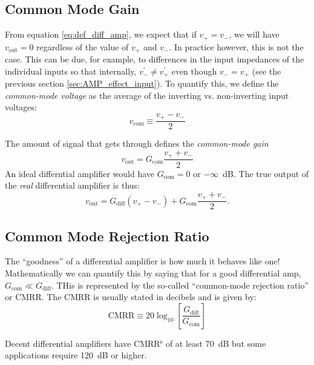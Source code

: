 \documentclass{tufte-book}
\begin{document}
\subsection{Common Mode Gain}
From equation \ref{eq:def_diff_amp}, we expect that if $v_+ = v_-$, we will have $v_\text{out} = 0$ regardless of the value of $v_+$ and $v_-$. In practice however, this is not the case. This can be due, for example, to differences in the input impedances of the individual inputs so that internally, $v_-^\prime \neq v_+^\prime$ even though $v_- = v_+$ (see the previous section \ref{sec:AMP_effect_input}). To quantify this, we define the \textit{common-mode voltage} as the average of the inverting vs. non-inverting input voltages:
\begin{equation}
\label{eq:common_mode_voltage}
v_\text{com} \equiv \frac{v_+-v_-}{2}
\end{equation}

The amount of signal that gets through defines the \textit{common-mode gain}
\begin{equation}
\label{eq:common_mode_gain}
v_\text{out} = G_\text{com}\frac{v_++v_-}{2}
\end{equation}
An ideal differntial amplifier would have $G_\text{com} = 0$ or $-\infty$~dB. The true output of the \textit{real} differential amplifier is thus:
\begin{equation}
\label{eq:real_diff_amp}
v_\text{out} = G_\text{diff}\left(v_+-v_-\right) + G_\text{com}\frac{v_++v_-}{2}.
\end{equation}

\subsection{Common Mode Rejection Ratio}
The ``goodness'' of a differential amplifier is how much it behaves like one! Mathematically we can quantify this by saying that for a good differential amp, $G_\text{com} \ll G_\text{diff}$. THis is represented by the so-called ``common-mode rejection ratio'' or CMRR. The CMRR is usually stated in decibels and is given by:
\begin{equation}
\label{eq:def_CMRR}
\text{CMRR} \equiv 20\log_{10}\left[\frac{G_\text{diff}}{G_\text{com}}\right]
\end{equation}
 
Decent differential amplifiers have CMRR$^\text{s}$ of at least 70~dB but some applications require 120~dB or higher.
\end{document}
